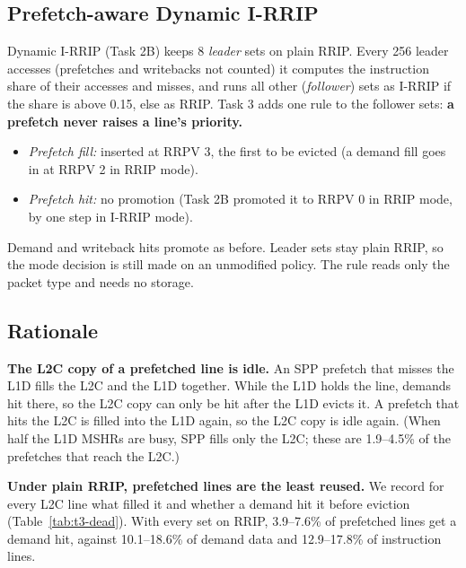 
\subsection{Prefetch-aware Dynamic I-RRIP}

Dynamic I-RRIP (Task 2B) keeps 8 \emph{leader} sets on plain RRIP. Every 256 leader accesses (prefetches and writebacks not counted) it computes the instruction share of their accesses and misses, and runs all other (\emph{follower}) sets as I-RRIP if the share is above 0.15, else as RRIP. Task 3 adds one rule to the follower sets: \textbf{a prefetch never raises a line's priority.}
\begin{itemize}
  \item \emph{Prefetch fill:} inserted at RRPV 3, the first to be evicted (a demand fill goes in at RRPV 2 in RRIP mode).
  \item \emph{Prefetch hit:} no promotion (Task 2B promoted it to RRPV 0 in RRIP mode, by one step in I-RRIP mode).
\end{itemize}
Demand and writeback hits promote as before. Leader sets stay plain RRIP, so the mode decision is still made on an unmodified policy. The rule reads only the packet type and needs no storage.

\subsection{Rationale}

\textbf{The L2C copy of a prefetched line is idle.} An SPP prefetch that misses the L1D fills the L2C and the L1D together. While the L1D holds the line, demands hit there, so the L2C copy can only be hit after the L1D evicts it. A prefetch that hits the L2C is filled into the L1D again, so the L2C copy is idle again. (When half the L1D MSHRs are busy, SPP fills only the L2C; these are 1.9--4.5\% of the prefetches that reach the L2C.)

\textbf{Under plain RRIP, prefetched lines are the least reused.} We record for every L2C line what filled it and whether a demand hit it before eviction (Table~\ref{tab:t3-dead}). With every set on RRIP, 3.9--7.6\% of prefetched lines get a demand hit, against 10.1--18.6\% of demand data and 12.9--17.8\% of instruction lines.

\begin{table}[H]
\centering
\small

\caption{Percentage of evicted L2C lines that got at least one demand hit before eviction, by what filled them, with SPP at the L1D (25M simulated instructions). RRIP, I-RRIP: follower sets pinned to that mode. Rule: the prefetch rule. Leader sets always run RRIP; they evict only 100--300 prefetched lines per trace, so that row's prefetch column is rough. T1--T3: Traces 1--3.}\label{tab:t3-dead}
\end{table}

